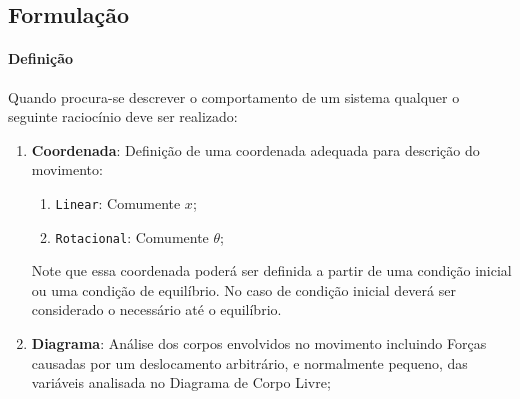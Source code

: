 \documentclass{article}
\begin{document}
\newpage\subsection{Formulação}
    \paragraph{Definição}Quando procura-se descrever o comportamento de um sistema qualquer o seguinte raciocínio deve ser realizado:
    \begin{enumerate}[rightmargin = \leftmargin]
        \item \textbf{Coordenada}: Definição de uma coordenada adequada para descrição do movimento:
        \begin{enumerate}[rightmargin = \leftmargin, noitemsep]
            \item \texttt{Linear}: Comumente $x$;
            \item \texttt{Rotacional}: Comumente $\theta$;
        \end{enumerate}\noindent
        Note que essa coordenada poderá ser definida a partir de uma condição inicial ou uma condição de equilíbrio. No caso de condição inicial deverá ser considerado o necessário até o equilíbrio.

        \item \textbf{Diagrama}: Análise dos corpos envolvidos no movimento incluindo Forças causadas por um deslocamento arbitrário, e normalmente pequeno, das variáveis analisada no Diagrama de Corpo Livre;


\end{enumerate}
\end{document}
